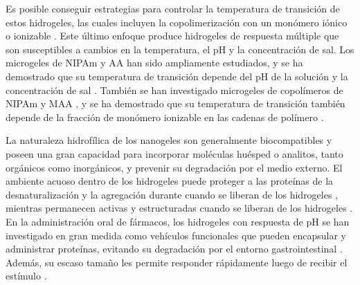 Es posible conseguir estrategias para controlar la temperatura de transici\'on de estos hidrogeles, las cuales incluyen la copolimerizaci\'on con un mon\'omero i\'onico o ionizable \cite{Cai2007,Macchione2019, Hirose1987,Lopez2020}.
Este \'ultimo enfoque produce hidrogeles de respuesta m\'ultiple que son susceptibles a cambios en la temperatura, el pH y la concentraci\'on de sal.
Los microgeles de NIPAm y AA han sido ampliamente estudiados, y se ha demostrado que su temperatura de transici\'on depende del pH de la soluci\'on y la concentraci\'on de sal \cite{Morris1997, Jones2000,Bradley2005,Begum2016}.
Tambi\'en se han investigado microgeles de copol\'imeros de NIPAm y MAA \cite{Dowding2000,Hoare2004,Giussi2015}, y se ha demostrado que su temperatura de transici\'on tambi\'en depende de la fracci\'on de mon\'omero ionizable en las cadenas de pol\'imero \cite{Morris1997,Jones2000, Hoare2004, Bradley2005, Lee2008,Wong2009,Hamzavi2016}.


La naturaleza hidrof\'ilica de los nanogeles son generalmente biocompatibles y poseen una gran capacidad para incorporar mol\'eculas hu\'esped o analitos, tanto org\'anicos como inorg\'anicos, y prevenir su degradaci\'on por el medio externo.
El ambiente acuoso dentro de los hidrogeles puede proteger a las prote\'inas de la desnaturalizaci\'on y la agregaci\'on durante cuando se liberan de los hidrogeles \cite{asayama2008comparison,sawada2010nano,beierle2014polymer}, mientras permanecen activas y estructuradas cuando se liberan de los hidrogeles \cite{vermonden2012hydrogels}.
En la administraci\'on oral de f\'armacos, los hidrogeles con respuesta de pH se han investigado en gran medida como veh\'iculos funcionales que pueden encapsular y administrar prote\'inas, evitando su degradaci\'on por el entorno gastrointestinal \cite{malmsten2010biomacromolecules,renukuntla2013approaches,koetting2014ph}.
Adem\'as, su escaso tama\~no les permite responder r\'apidamente luego de recibir el est\'imulo \cite{tanaka1979kinetics}.




